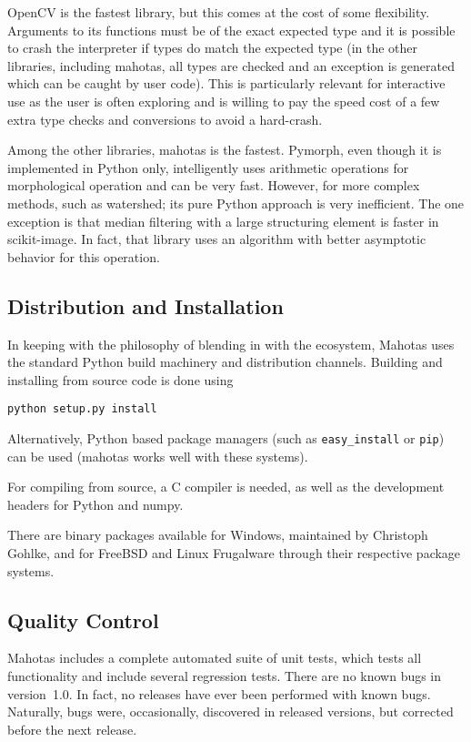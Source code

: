 \documentclass{scrartcl}
\newcommand*{\cpp}{{C\nolinebreak[4]\hspace{-.05em}\raisebox{.4ex}{\tiny\textbf{++}}}}
\begin{document}
OpenCV is the fastest library, but this comes at the cost of some flexibility.
Arguments to its functions must be of the exact expected type and it is
possible to crash the interpreter if types do match the expected type (in the
other libraries, including mahotas, all types are checked and an exception is
generated which can be caught by user code). This is particularly relevant for
interactive use as the user is often exploring and is willing to pay the speed
cost of a few extra type checks and conversions to avoid a hard-crash.

Among the other libraries, mahotas is the fastest. Pymorph, even though it is
implemented in Python only, intelligently uses arithmetic operations for
morphological operation and can be very fast. However, for more complex
methods, such as watershed; its pure Python approach is very inefficient. The
one exception is that median filtering with a large structuring element is
faster in scikit-image. In fact, that library uses an algorithm with better
asymptotic behavior for this operation.

\subsection{Distribution and Installation}

In keeping with the philosophy of blending in with the ecosystem, Mahotas uses
the standard Python build machinery and distribution channels. Building and
installing from source code is done using
\begin{verbatim}
python setup.py install
\end{verbatim}
Alternatively, Python based package managers (such as \texttt{easy\_install} or
\texttt{pip}) can be used (mahotas works well with these systems).

For compiling from source, a \cpp{} compiler is needed, as well as the
development headers for Python and numpy.

There are binary packages available for Windows, maintained by Christoph
Gohlke, and for FreeBSD and Linux Frugalware through their respective package
systems.

\subsection{Quality Control}

Mahotas includes a complete automated suite of unit tests, which tests all
functionality and include several regression tests. There are no known bugs in
version~1.0. In fact, no releases have ever been performed with known bugs.
Naturally, bugs were, occasionally, discovered in released versions, but
corrected before the next release.
\end{document}
